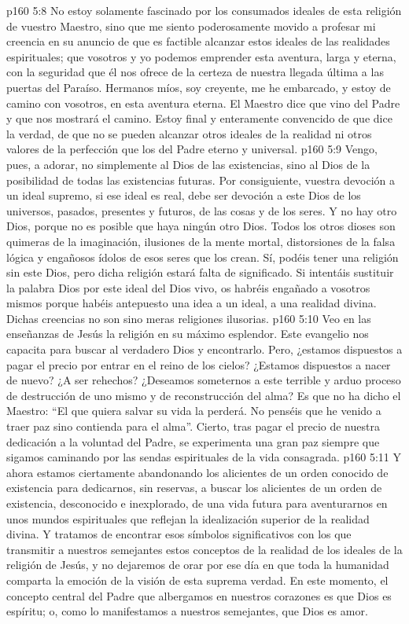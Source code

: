 \vs p160 5:8 No estoy solamente fascinado por los consumados ideales de esta religión de vuestro Maestro, sino que me siento poderosamente movido a profesar mi creencia en su anuncio de que es factible alcanzar estos ideales de las realidades espirituales; que vosotros y yo podemos emprender esta aventura, larga y eterna, con la seguridad que él nos ofrece de la certeza de nuestra llegada última a las puertas del Paraíso. Hermanos míos, soy creyente, me he embarcado, y estoy de camino con vosotros, en esta aventura eterna. El Maestro dice que vino del Padre y que nos mostrará el camino. Estoy final y enteramente convencido de que dice la verdad, de que no se pueden alcanzar otros ideales de la realidad ni otros valores de la perfección que los del Padre eterno y universal.
\vs p160 5:9 Vengo, pues, a adorar, no simplemente al Dios de las existencias, sino al Dios de la posibilidad de todas las existencias futuras. Por consiguiente, vuestra devoción a un ideal supremo, si ese ideal es real, debe ser devoción a este Dios de los universos, pasados, presentes y futuros, de las cosas y de los seres. Y no hay otro Dios, porque no es posible que haya ningún otro Dios. Todos los otros dioses son quimeras de la imaginación, ilusiones de la mente mortal, distorsiones de la falsa lógica y engañosos ídolos de esos seres que los crean. Sí, podéis tener una religión sin este Dios, pero dicha religión estará falta de significado. Si intentáis sustituir la palabra Dios por este ideal del Dios vivo, os habréis engañado a vosotros mismos porque habéis antepuesto una idea a un ideal, a una realidad divina. Dichas creencias no son sino meras religiones ilusorias.
\vs p160 5:10 Veo en las enseñanzas de Jesús la religión en su máximo esplendor. Este evangelio nos capacita para buscar al verdadero Dios y encontrarlo. Pero, ¿estamos dispuestos a pagar el precio por entrar en el reino de los cielos? ¿Estamos dispuestos a nacer de nuevo? ¿A ser rehechos? ¿Deseamos someternos a este terrible y arduo proceso de destrucción de uno mismo y de reconstrucción del alma? Es que no ha dicho el Maestro: “El que quiera salvar su vida la perderá. No penséis que he venido a traer paz sino contienda para el alma”. Cierto, tras pagar el precio de nuestra dedicación a la voluntad del Padre, se experimenta una gran paz siempre que sigamos caminando por las sendas espirituales de la vida consagrada.
\vs p160 5:11 Y ahora estamos ciertamente abandonando los alicientes de un orden conocido de existencia para dedicarnos, sin reservas, a buscar los alicientes de un orden de existencia, desconocido e inexplorado, de una vida futura para aventurarnos en unos mundos espirituales que reflejan la idealización superior de la realidad divina. Y tratamos de encontrar esos símbolos significativos con los que transmitir a nuestros semejantes estos conceptos de la realidad de los ideales de la religión de Jesús, y no dejaremos de orar por ese día en que toda la humanidad comparta la emoción de la visión de esta suprema verdad. En este momento, el concepto central del Padre que albergamos en nuestros corazones es que Dios es espíritu; o, como lo manifestamos a nuestros semejantes, que Dios es amor.
